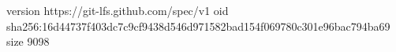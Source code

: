 version https://git-lfs.github.com/spec/v1
oid sha256:16d44737f403dc7c9cf9438d546d971582bad154f069780c301e96bac794ba69
size 9098
